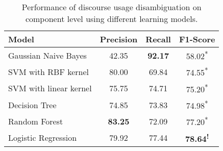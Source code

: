 \begin{table}[!htbp]
\centering
\begin{tabular}{|l|c|c|c|}
\hline

Model                  &     Precision &     Recall &     F1-Score                 \\ \hline
Gaussian Naive Bayes   &     42.35     & \bf 92.17  &     58.02\textsuperscript{*} \\ \hline
SVM with RBF kernel    &     80.00     &     69.84  &     74.55\textsuperscript{*} \\ \hline
SVM with linear kernel &     75.75     &     74.71  &     75.20\textsuperscript{*} \\ \hline
Decision Tree          &     74.85     &     73.83  &     74.98\textsuperscript{*} \\ \hline
Random Forest          & \bf 83.25     &     72.09  &     77.20\textsuperscript{*} \\ \hline
Logistic Regression    &     79.92     &     77.44  & \bf 78.64\textsuperscript{!} \\ \hline

\end{tabular}
\caption{\label{t:recognition-models} Performance of discourse usage
disambiguation on component level using different learning models. }
\end{table}
